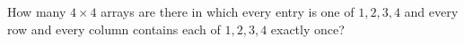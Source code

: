 How many $4\times4$ arrays are there in which every entry is one of $1,2,3,4$ and every row and every column contains each of $1,2,3,4$ exactly once?
